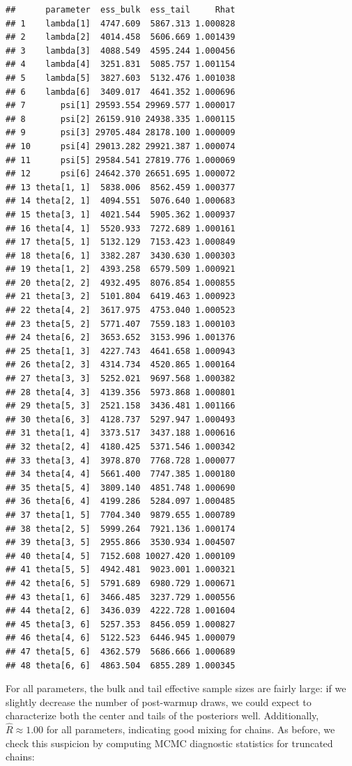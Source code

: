 \documentclass[
]{article}
\begin{document}
\begin{verbatim}
##      parameter  ess_bulk  ess_tail     Rhat
## 1    lambda[1]  4747.609  5867.313 1.000828
## 2    lambda[2]  4014.458  5606.669 1.001439
## 3    lambda[3]  4088.549  4595.244 1.000456
## 4    lambda[4]  3251.831  5085.757 1.001154
## 5    lambda[5]  3827.603  5132.476 1.001038
## 6    lambda[6]  3409.017  4641.352 1.000696
## 7       psi[1] 29593.554 29969.577 1.000017
## 8       psi[2] 26159.910 24938.335 1.000115
## 9       psi[3] 29705.484 28178.100 1.000009
## 10      psi[4] 29013.282 29921.387 1.000074
## 11      psi[5] 29584.541 27819.776 1.000069
## 12      psi[6] 24642.370 26651.695 1.000072
## 13 theta[1, 1]  5838.006  8562.459 1.000377
## 14 theta[2, 1]  4094.551  5076.640 1.000683
## 15 theta[3, 1]  4021.544  5905.362 1.000937
## 16 theta[4, 1]  5520.933  7272.689 1.000161
## 17 theta[5, 1]  5132.129  7153.423 1.000849
## 18 theta[6, 1]  3382.287  3430.630 1.000303
## 19 theta[1, 2]  4393.258  6579.509 1.000921
## 20 theta[2, 2]  4932.495  8076.854 1.000855
## 21 theta[3, 2]  5101.804  6419.463 1.000923
## 22 theta[4, 2]  3617.975  4753.040 1.000523
## 23 theta[5, 2]  5771.407  7559.183 1.000103
## 24 theta[6, 2]  3653.652  3153.996 1.001376
## 25 theta[1, 3]  4227.743  4641.658 1.000943
## 26 theta[2, 3]  4314.734  4520.865 1.000164
## 27 theta[3, 3]  5252.021  9697.568 1.000382
## 28 theta[4, 3]  4139.356  5973.868 1.000801
## 29 theta[5, 3]  2521.158  3436.481 1.001166
## 30 theta[6, 3]  4128.737  5297.947 1.000493
## 31 theta[1, 4]  3373.517  3437.188 1.000616
## 32 theta[2, 4]  4180.425  5371.546 1.000342
## 33 theta[3, 4]  3978.870  7768.728 1.000077
## 34 theta[4, 4]  5661.400  7747.385 1.000180
## 35 theta[5, 4]  3809.140  4851.748 1.000690
## 36 theta[6, 4]  4199.286  5284.097 1.000485
## 37 theta[1, 5]  7704.340  9879.655 1.000789
## 38 theta[2, 5]  5999.264  7921.136 1.000174
## 39 theta[3, 5]  2955.866  3530.934 1.004507
## 40 theta[4, 5]  7152.608 10027.420 1.000109
## 41 theta[5, 5]  4942.481  9023.001 1.000321
## 42 theta[6, 5]  5791.689  6980.729 1.000671
## 43 theta[1, 6]  3466.485  3237.729 1.000556
## 44 theta[2, 6]  3436.039  4222.728 1.001604
## 45 theta[3, 6]  5257.353  8456.059 1.000827
## 46 theta[4, 6]  5122.523  6446.945 1.000079
## 47 theta[5, 6]  4362.579  5686.666 1.000689
## 48 theta[6, 6]  4863.504  6855.289 1.000345
\end{verbatim}

\linespread{1}

For all parameters, the bulk and tail effective sample sizes are fairly large: if we slightly decrease the number of post-warmup draws, we could expect to characterize both the center and tails of the posteriors well. Additionally, \(\hat{R} \approx 1.00\) for all parameters, indicating good mixing for chains. As before, we check this suspicion by computing MCMC diagnostic statistics for truncated chains:
\end{document}
